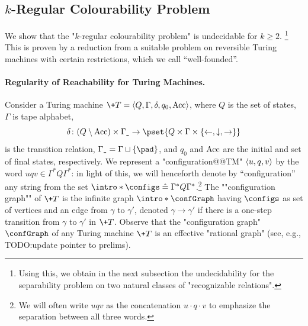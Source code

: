 \subsection{
    \AP\label{sec:dichotomy-k-regular-colourability}%
    $k$-Regular Colourability Problem
}

We show that the "$k$-regular colourability problem" is undecidable for $k\geq 2$.%
\footnote{
    Using this, we obtain in the next subsection 
    the undecidability for the separability problem on two natural classes of 
    "recognizable relations".
}
This is proven by a reduction from a suitable problem on reversible 
Turing machines with certain restrictions, which we call ``well-founded''.

\paragraph*{Regularity of Reachability for Turing Machines.}
Consider a Turing machine $\+T = \tup{Q,\Gamma,\delta,q_0,\Acc}$, where $Q$ is the set of states, $\Gamma$ is tape alphabet,
\[
    \delta\colon (Q \setminus \Acc) \times \Gamma_{\smallpad} \to \pset{Q \times \Gamma \times \set{\leftarrow, \downarrow, \rightarrow}}
\]
is the transition relation, $\Gamma_{\smallpad} = \Gamma \dcup \set{\pad}$, and $q_0$ and $\textrm{Acc}$ are the initial and set of final states, respectively.
%
We represent a "configuration@@TM" $\langle u, q, v\rangle$ by the word $uqv \in \Gamma^* Q \Gamma^*$:
in light of this, we will henceforth denote by ``configuration'' any string from the set  \AP$\intro*\configs \defeq  \Gamma^* Q \Gamma^*$.\footnote{We will often write
$uqv$ as the concatenation $u\cdot q \cdot v$ to emphasize
the separation between all three words.}
The \AP""configuration graph"" of $\+T$ is the infinite graph $\intro*\confGraph$ having $\configs$ as set of vertices and an edge from $\gamma$ to $\gamma'$, denoted $\gamma \rightarrow \gamma'$ if there is a one-step transition from $\gamma$ to $\gamma'$ in $\+T$. Observe that the "configuration graph" $\confGraph$ of any Turing machine $\+T$ is an effective "rational graph" (see, e.g., \cite{KuskeLohrey2010AutomaticGraphs} TODO:update pointer to prelims).

